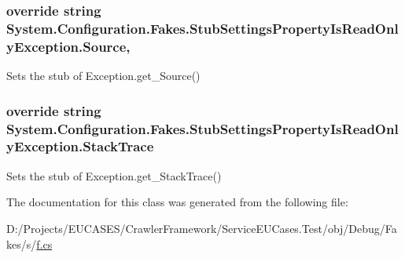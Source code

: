 \hypertarget{class_system_1_1_configuration_1_1_fakes_1_1_stub_settings_property_is_read_only_exception_abf075821e211dd3cb217412f07464a6a}{
\subsubsection[{Source}]{\setlength{\rightskip}{0pt plus 5cm}override string System.\-Configuration.\-Fakes.\-Stub\-Settings\-Property\-Is\-Read\-Only\-Exception.\-Source\hspace{0.3cm}{\ttfamily [get]}, {\ttfamily [set]}}}\label{class_system_1_1_configuration_1_1_fakes_1_1_stub_settings_property_is_read_only_exception_abf075821e211dd3cb217412f07464a6a}


Sets the stub of Exception.\-get\-\_\-\-Source()

\hypertarget{class_system_1_1_configuration_1_1_fakes_1_1_stub_settings_property_is_read_only_exception_a99aacc5d847cc66ea15bfb6170ab961e}{
\subsubsection[{Stack\-Trace}]{\setlength{\rightskip}{0pt plus 5cm}override string System.\-Configuration.\-Fakes.\-Stub\-Settings\-Property\-Is\-Read\-Only\-Exception.\-Stack\-Trace\hspace{0.3cm}{\ttfamily [get]}}}\label{class_system_1_1_configuration_1_1_fakes_1_1_stub_settings_property_is_read_only_exception_a99aacc5d847cc66ea15bfb6170ab961e}


Sets the stub of Exception.\-get\-\_\-\-Stack\-Trace()



The documentation for this class was generated from the following file\-:\begin{DoxyCompactItemize}
\item 
D\-:/\-Projects/\-E\-U\-C\-A\-S\-E\-S/\-Crawler\-Framework/\-Service\-E\-U\-Cases.\-Test/obj/\-Debug/\-Fakes/s/\hyperlink{s_2f_8cs}{f.\-cs}\end{DoxyCompactItemize}
